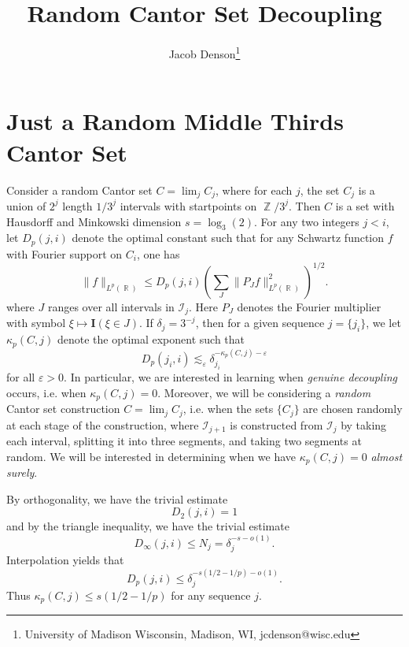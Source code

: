 \documentclass[dvipsnames,letterpaper,12pt]{article}
\title{Random Cantor Set Decoupling}
\author{Jacob Denson\footnote{University of Madison Wisconsin, Madison, WI, jcdenson@wisc.edu}}
\numberwithin{equation}{section}
\DeclareMathOperator{\RR}{\mathbb{R}}
\DeclareMathOperator{\ZZ}{\mathbb{Z}}
\numberwithin{theorem}{section}
\begin{document}
\maketitle

\section{Just a Random Middle Thirds Cantor Set}

Consider a random Cantor set $C = \lim_j C_j$, where for each $j$, the set $C_j$ is a union of $2^j$ length $1/3^j$ intervals with startpoints on $\ZZ / 3^j$. Then $C$ is a set with Hausdorff and Minkowski dimension $s = \log_3(2)$. For any two integers $j < i$, let $D_p(j,i)$ denote the optimal constant such that for any Schwartz function $f$ with Fourier support on $C_i$, one has
%
\[ \| f \|_{L^p(\RR)} \leq D_p(j,i) \left( \sum_J \| P_J f \|_{L^p(\RR)}^2 \right)^{1/2}. \]
%
where $J$ ranges over all intervals in $\mathcal{I}_j$. Here $P_J$ denotes the Fourier multiplier with symbol $\xi \mapsto \mathbf{I}(\xi \in J)$. If $\delta_j = 3^{-j}$, then for a given sequence $j = \{ j_i \}$, we let $\kappa_p(C,j)$ denote the optimal exponent such that
%
\[ D_p(j_i,i) \lesssim_\varepsilon \delta_{j_i}^{- \kappa_p(C,j) - \varepsilon} \]
%
for all $\varepsilon > 0$. In particular, we are interested in learning when \emph{genuine decoupling} occurs, i.e. when $\kappa_p(C,j) = 0$. Moreover, we will be considering a \emph{random} Cantor set construction $C = \lim_j C_j$, i.e. when the sets $\{ C_j \}$ are chosen randomly at each stage of the construction, where $\mathcal{I}_{j+1}$ is constructed from $\mathcal{I}_j$ by taking each interval, splitting it into three segments, and taking two segments at random. We will be interested in determining when we have $\kappa_p(C,j) = 0$ \emph{almost surely}.

By orthogonality, we have the trivial estimate
%
\[ D_2(j,i) = 1 \]
%
and by the triangle inequality, we have the trivial estimate
%
\[ D_\infty(j,i) \leq N_j = \delta_j^{-s-o(1)}. \]
%
Interpolation yields that
%
\[ D_p(j,i) \leq \delta_j^{-s(1/2 - 1/p) - o(1)}. \]
%
Thus $\kappa_p(C,j) \leq s(1/2 - 1/p)$ for any sequence $j$.
\end{document}
